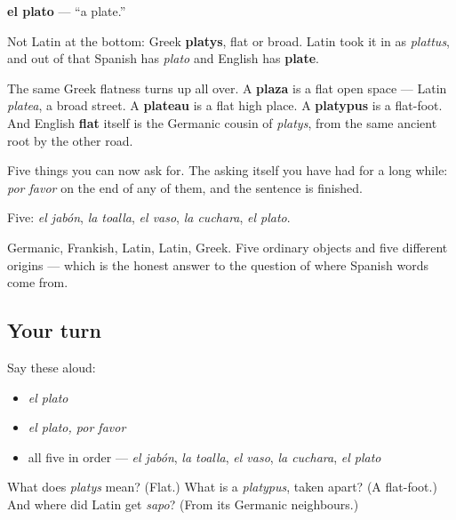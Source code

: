 \begin{cousinweb}
\textbf{el plato} — \textquotedblleft{}a plate.\textquotedblright{}

Not Latin at the bottom: Greek \textbf{platys}, flat or broad. Latin took it in as \emph{plattus}, and out of that Spanish has \emph{plato} and English has \textbf{plate}.

The same Greek flatness turns up all over. A \textbf{plaza} is a flat open space — Latin \emph{platea}, a broad street. A \textbf{plateau} is a flat high place. A \textbf{platypus} is a flat-foot. And English \textbf{flat} itself is the Germanic cousin of \emph{platys}, from the same ancient root by the other road.

Five things you can now ask for. The asking itself you have had for a long while: \emph{por favor} on the end of any of them, and the sentence is finished.
\end{cousinweb}

\begin{grammarlens}[title={What you've built}]
Five: \emph{el jabón}, \emph{la toalla}, \emph{el vaso}, \emph{la cuchara}, \emph{el plato}.

Germanic, Frankish, Latin, Latin, Greek. Five ordinary objects and five different origins — which is the honest answer to the question of where Spanish words come from.
\end{grammarlens}

\subsection*{Your turn}
Say these aloud:

\begin{itemize}
\raggedright
  \item \emph{el plato}
  \item \emph{el plato, por favor}
  \item all five in order — \emph{el jabón}, \emph{la toalla}, \emph{el vaso}, \emph{la cuchara}, \emph{el plato}
\end{itemize}

\begin{tcolorbox}[breakable,colback=teal!4,colframe=teal!35!black,title={Before you move on}]
What does \emph{platys} mean? (Flat.) What is a \emph{platypus}, taken apart? (A flat-foot.) And where did Latin get \emph{sapo}? (From its Germanic neighbours.)
\end{tcolorbox}
